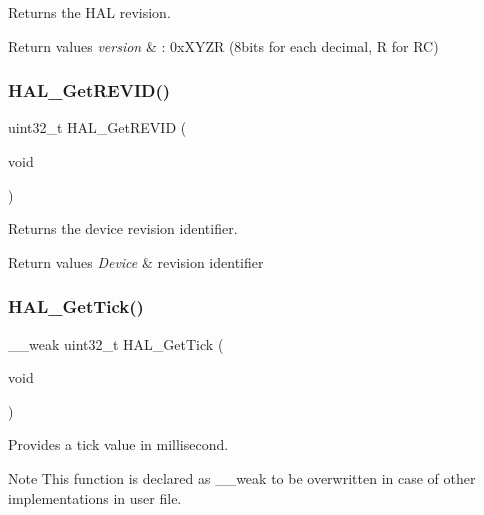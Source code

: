 Returns the H\+AL revision. 


\begin{DoxyRetVals}{Return values}
{\em version} & \+: 0x\+X\+Y\+ZR (8bits for each decimal, R for RC) \\
\hline
\end{DoxyRetVals}
\mbox{\label{group___h_a_l___exported___functions___group2_gae051ef9e932404b21f5877c7186406b8}} 
\subsubsection{\texorpdfstring{HAL\_GetREVID()}{HAL\_GetREVID()}}
{\footnotesize\ttfamily uint32\+\_\+t H\+A\+L\+\_\+\+Get\+R\+E\+V\+ID (\begin{DoxyParamCaption}\item[{void}]{ }\end{DoxyParamCaption})}



Returns the device revision identifier. 


\begin{DoxyRetVals}{Return values}
{\em Device} & revision identifier \\
\hline
\end{DoxyRetVals}
\mbox{\label{group___h_a_l___exported___functions___group2_gac9b3a85a73735ac840d0dcb59bc0fdd6}} 
\subsubsection{\texorpdfstring{HAL\_GetTick()}{HAL\_GetTick()}}
{\footnotesize\ttfamily \+\_\+\+\_\+weak uint32\+\_\+t H\+A\+L\+\_\+\+Get\+Tick (\begin{DoxyParamCaption}\item[{void}]{ }\end{DoxyParamCaption})}



Provides a tick value in millisecond. 

\begin{DoxyNote}{Note}
This function is declared as \+\_\+\+\_\+weak to be overwritten in case of other implementations in user file. 
\end{DoxyNote}

